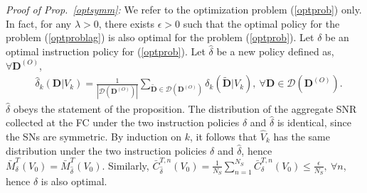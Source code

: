 \documentclass[10pt,twocolumn,twoside]{IEEEtran}
\theoremstyle{plain}
\begin{document}
 \section{}
 \label{Proofoptsymm}
 \noindent\emph{Proof of Prop.~\ref{optsymm}:}
We refer to the optimization problem (\ref{optprob}) only. In fact, for any $\lambda>0$,
there exists $\epsilon>0$ such that the optimal policy for the problem (\ref{optproblag}) is also optimal for the problem (\ref{optprob}).
Let $\delta$ be an optimal instruction policy for (\ref{optprob}).
Let $\hat\delta$ be a new policy defined as, $\forall \mathbf D^{(O)}$,
\begin{align*}
&\hat \delta_k(\mathbf D|V_{k})\!=\!\frac{1}{|\mathcal D(\mathbf D^{(O)})|}\!\sum_{\tilde{\mathbf D}\in \mathcal D(\mathbf D^{(O)})}\!\!\!\delta_k(\tilde{\mathbf D}|V_{k}),\ 
\forall \mathbf D\in \mathcal D(\mathbf D^{(O)}).
\end{align*}
$\hat\delta$ obeys the statement of the proposition.
The distribution of the aggregate SNR collected at the FC
under the two instruction policies $\delta$ and $\hat \delta$ is identical, since the SNs are symmetric.
By induction on $k$, it follows that $\hat V_k$ has the same distribution under the two instruction policies
$\delta$ and $\hat\delta$, hence
$\bar M_{\delta}^{T}(V_0)=\bar M_{\hat{\delta}}^{T}(V_0)$.
Similarly, $\bar C_{\hat{\delta}}^{T,n}(V_0)=\frac{1}{N_S}\sum_{n=1}^{N_S}\bar C_{\delta}^{T,n}(V_0)\leq\frac{\epsilon}{N_S},\ \forall n$,
hence $\hat\delta$ is also optimal.
\hfill\QED
\end{document}

